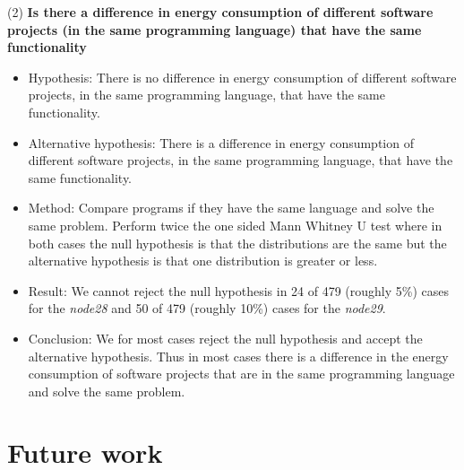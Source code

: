 (2) \textbf{Is there a difference in energy consumption of different software projects (in the same programming language) that have the same functionality}
\begin{itemize}
\item Hypothesis: There is no difference in energy consumption of different software projects, in the same programming language, that have the same functionality.
\item Alternative hypothesis: There is a difference in energy consumption of different software projects, in the same programming language, that have the same functionality.
\item Method: Compare programs if they have the same language and solve the same problem. Perform twice the one sided Mann Whitney U test where in both cases the null hypothesis is that the distributions are the same but the alternative hypothesis is that one distribution is greater or less.
\item Result: We cannot reject the null hypothesis in 24 of 479 (roughly 5\%) cases for the \textit{node28} and 50 of 479 (roughly 10\%) cases for the \textit{node29}.
\item Conclusion: We for most cases reject the null hypothesis and accept the alternative hypothesis. Thus in most cases there is a difference in the energy consumption of software projects that are in the same programming language and solve the same problem.
\end{itemize}


\section{Future work}
\label{sec:future_work}
